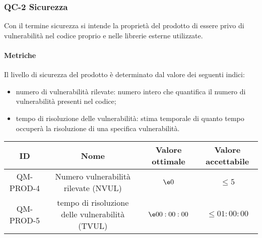 \subsubsection{QC-2 Sicurezza}
Con il termine sicurezza si intende la proprietà del prodotto di essere privo di vulnerabilità nel codice proprio e nelle librerie esterne utilizzate.

	\paragraph{Metriche}
	Il livello di sicurezza del prodotto è determinato dal valore dei seguenti indici:
	\begin{itemize}
		\item numero di vulnerabilità rilevate: numero intero che quantifica il numero di vulnerabilità presenti nel codice;
		\item tempo di risoluzione delle vulnerabilità: stima temporale di quanto tempo occuperà la risoluzione di una specifica vulnerabilità.
	\end{itemize}
	\begin{center}
		\begin{tabular}{|c|c|c|c|}
			\rowcolor{lighter-grayer}
			\hline
			ID & Nome & Valore ottimale & Valore accettabile \\
			\hline
			QM-PROD-4 & Numero vulnerabilità rilevate (NVUL) & \(\e 0\) & \(\le 5\) \\
			\hline
			QM-PROD-5 & tempo di risoluzione delle vulnerabilità (TVUL) & \(\e 00:00:00\) &  \(\le 01:00:00\) \\
			\hline
		\end{tabular}
	\end{center}
